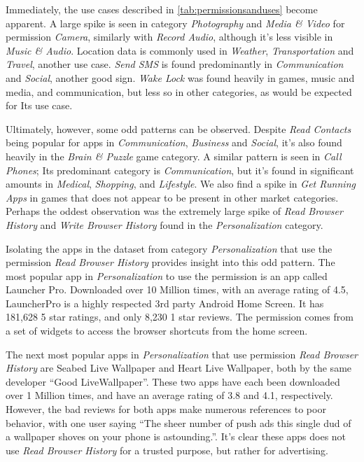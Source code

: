Immediately, the use cases described in \ref{tab:permissionsanduses} become apparent. A large spike is seen in category \textit{Photography} and \textit{Media \& Video} for permission \textit{Camera}, similarly with \textit{Record Audio}, although it's less visible in \textit{Music \& Audio}. Location data is commonly used in \textit{Weather}, \textit{Transportation} and \textit{Travel}, another use case. \textit{Send SMS} is found predominantly in \textit{Communication} and \textit{Social}, another good sign. \textit{Wake Lock} was found heavily in games, music and media, and communication, but less so in other categories, as would be expected for Its use case.

Ultimately, however, some odd patterns can be observed. Despite \textit{Read Contacts} being popular for apps in \textit{Communication}, \textit{Business} and \textit{Social}, it's also found heavily in the \textit{Brain \& Puzzle} game category. A similar pattern is seen in \textit{Call Phones}; Its predominant category is \textit{Communication}, but it's found in significant amounts in \textit{Medical}, \textit{Shopping}, and \textit{Lifestyle}. We also find a spike in \textit{Get Running Apps} in games that does not appear to be present in other market categories. Perhaps the oddest observation was the extremely large spike of \textit{Read Browser History} and \textit{Write Browser History} found in the \textit{Personalization} category.

Isolating the apps in the dataset from category \textit{Personalization} that use the permission \textit{Read Browser History} provides insight into this odd pattern. The most popular app in \textit{Personalization} to use the permission is an app called Launcher Pro\citep{launcherpro}. Downloaded over 10 Million times, with an average rating of 4.5, LauncherPro is a highly respected 3rd party Android Home Screen. It has 181,628 5 star ratings, and only 8,230 1 star reviews. The permission comes from a set of widgets to access the browser shortcuts from the home screen.

\begin{sloppypar}
The next most popular apps in \textit{Personalization} that use permission \textit{Read Browser History} are Seabed Live Wallpaper\citep{seabedlivewallpaper} and Heart Live Wallpaper\citep{heartlivewallpaper}, both by the same developer ``Good LiveWallpaper''\citep{goodlivewallpaper}. These two apps have each been downloaded over 1 Million times, and have an average rating of 3.8 and 4.1, respectively. However, the bad reviews for both apps make numerous references to poor behavior, with one user saying ``The sheer number of push ads this single dud of a wallpaper shoves on your phone is astounding.''\citep{seabedlivewallpaper}. It's clear these apps does not use \textit{Read Browser History} for a trusted purpose, but rather for advertising.
\end{sloppypar}

